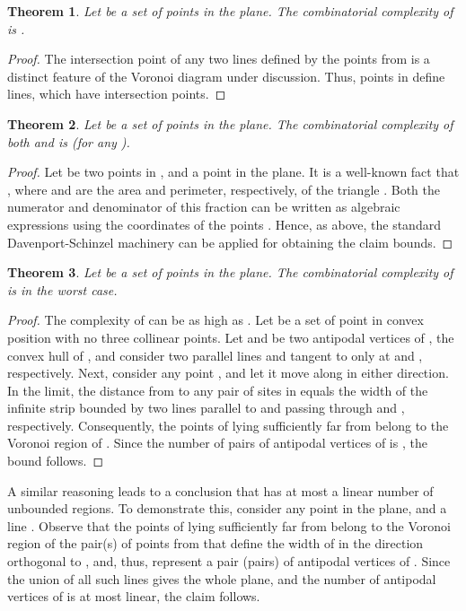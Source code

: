 \documentclass[10pt, conference, compsocconf]{IEEEtran}
\newtheorem{theorem}{Theorem}
\begin{document}
\begin{theorem}
   \label{TH-lb-ins-rad-nn}
   Let  be a set of  points in the plane.
   The combinatorial complexity of  is .
\end{theorem}

\begin{proof}
   The intersection point of any two lines defined by the points from 
   is a distinct feature of the Voronoi diagram under discussion.
   Thus,  points in  define  lines, which have
    intersection points.
\end{proof}

\begin{theorem}
   Let  be a set of  points in the plane.
   The combinatorial complexity of both  and
    is  (for any ).
\end{theorem}

\begin{proof}
   Let  be two points in , and  a point in the plane.
   It is a well-known fact that ,
   where  and  are the area and perimeter,
   respectively, of the triangle .  Both the numerator and
   denominator of this fraction can be written as algebraic expressions
   using the coordinates of the points .  Hence, as above, the
   standard Davenport-Schinzel machinery can be applied for obtaining the
   claim bounds.
\end{proof}

\begin{theorem}
   Let  be a set of  points in the plane.
   The combinatorial complexity of  is 
   in the worst case.
\end{theorem}

\begin{proof}
   The complexity of  can be as high as .
Let  be a set of  point in convex position with no three
   collinear points.
   Let  and  be two antipodal vertices of , the
   convex hull of , and consider two parallel lines  and
    tangent to  only at  and ,
   respectively.
   Next, consider any point , and let it move along 
   in either direction.  In the limit, the distance from  to any pair
    of sites in  equals the width of the infinite strip bounded
   by two lines parallel to  and passing through  and ,
   respectively.  Consequently, the points of  lying sufficiently
   far from  belong to the Voronoi region of .
   Since the number of pairs of antipodal vertices of 
   is , the bound follows.
\end{proof}

A similar reasoning leads to a conclusion that  has at
most a linear number of unbounded regions.  To demonstrate this, consider
any point  in the plane, and a line .  Observe that the
points of  lying sufficiently far from  belong to the Voronoi
region of the pair(s) of points from  that define the width of  in
the direction orthogonal to , and, thus, represent a pair (pairs)
of antipodal vertices of .  Since the union of all such
lines gives the whole plane, and the number of antipodal vertices of
 is at most linear, the claim follows.
\end{document}
